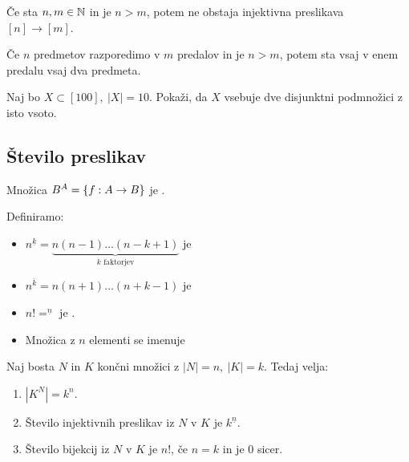 \begin{trditev}
    Če sta $n, m \in \mathbb{N}$ in je $n > m$, potem ne obstaja injektivna preslikava $[n] \to [m]$.
\end{trditev}

\begin{opomba}
    Če $n$ predmetov razporedimo v $m$ predalov in je $n > m$, potem sta vsaj v enem predalu vsaj dva predmeta.
\end{opomba}

\begin{primer}
    Naj bo $X \subset [100], \ |X|=10$. Pokaži, da $X$ vsebuje dve disjunktni podmnožici z isto vsoto.
\end{primer}

\subsection{Število preslikav}
\begin{definicija}
    Množica $B^A = \left\{f: A \to B\right\}$ je .
\end{definicija}

\begin{definicija} Definiramo:
    \begin{itemize}
        \item $n^{\underline{k}} = \underbrace{n(n-1) \ldots (n-k+1)}_\text{$k$ faktorjev}$ je 
        \item $n^{\overline{k}} = n(n+1) \ldots (n+k-1)$ je 
        \item $n! = ^{\underline{n}}$ je .
        \item Množica z $n$ elementi se imenuje 
    \end{itemize}
\end{definicija}

\begin{trditev}
    Naj bosta $N$ in $K$ končni množici z $|N| = n, \ |K| = k$. Tedaj velja:
    \begin{enumerate}
        \item $|K^N| = k^n$.
        \item Število injektivnih preslikav iz $N$ v $K$ je $k^{\underline{n}}$.
        \item Število bijekcij iz $N$ v $K$ je $n!$, če $n = k$ in je $0$ sicer.
    \end{enumerate} 
\end{trditev}

